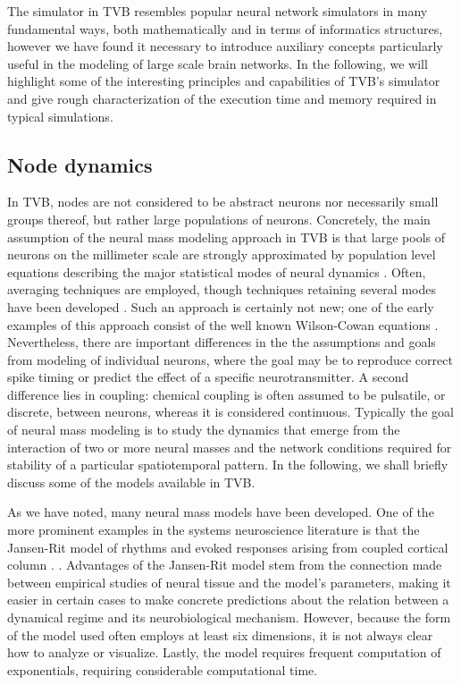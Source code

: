 The simulator in TVB resembles popular neural network simulators in 
many fundamental ways, both mathematically and in terms of informatics 
structures, however we have found it necessary to introduce auxiliary
concepts particularly useful in the modeling of large scale brain 
networks. In the following, we will highlight some of the interesting
principles and capabilities of TVB's simulator and give rough characterization
of the execution time and memory required in typical simulations.

\subsection{Node dynamics}

	In TVB, nodes are not considered to be abstract neurons nor necessarily
	small groups thereof, but rather large populations of neurons. Concretely,
	the main assumption of the neural mass modeling approach in TVB is that
	large pools of neurons on the millimeter scale are strongly approximated
	by population level equations describing the major statistical modes of
	neural dynamics \cite{Freeman_1975book}. Often, averaging techniques are
	employed, though techniques retaining several modes have been developed
	\cite{Stefanescu_2008, Stefanescu_2011}. Such an approach is certainly not
	new; one of the early examples of this approach consist of the well known
	Wilson-Cowan equations \cite{Wilson_1973}. Nevertheless, there are
	important differences in the the assumptions and goals from modeling of
	individual neurons, where the goal may be to reproduce correct spike
	timing or predict the effect of  a specific neurotransmitter. A second
	difference lies in coupling: chemical coupling is often assumed to be
	pulsatile, or discrete, between neurons, whereas it is considered
	continuous. Typically the goal of neural mass modeling is to study the
	dynamics that emerge from the interaction of two or more neural masses and
	the network conditions required for stability of a particular
	spatiotemporal pattern. In the following, we shall  briefly discuss some
	of the models available in TVB.

	As we have noted, many neural mass models have been developed. One of
	the more prominent examples in the systems neuroscience literature is 
	that the Jansen-Rit model of rhythms and evoked responses arising from
	coupled cortical column \cite{Zetterberg_1978, Jansen_1995, Spiegler_2010}. 
	.
	Advantages of the Jansen-Rit model stem from the connection made
	between empirical studies of neural tissue and the model's parameters, 
	making it easier in certain cases to make concrete predictions about
	the relation between a dynamical regime and its neurobiological 
	mechanism. However, because the form of the model used often employs
	at least six dimensions, it is not always clear how to analyze or
	visualize. Lastly, the model requires frequent computation of exponentials,
	requiring considerable computational time. 

